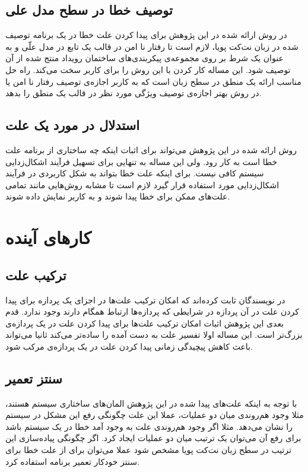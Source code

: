 \subsection{توصیف خطا در سطح مدل علی}
در روش ارائه شده در این پژوهش برای پیدا کردن علت خطا در یک برنامه توصیف شده در زبان نت‌کت پویا، لازم است تا رفتار نا امن در قالب یک تابع در مدل علّی و به عنوان یک شرط بر روی مجموعه‌ی پیکربندی‌های ساختمان رویداد منتج شده از‌ آن توصیف شود.
این مساله کار کردن با این روش را برای کاربر سخت می‌کند. 
راه حل مناسب ارائه یک منطق در سطح زبان است که به کاربر اجازه‌ی توصیف رفتار نا امن یا در روش بهتر اجازه‌ی توصیف ویژگی مورد نظر در قالب یک منطق را بدهد.

\subsection{استدلال در مورد یک علت}
روش ارائه شده در این پژوهش می‌تواند برای اثبات اینکه چه ساختاری از برنامه علت خطا است به کار رود. 
ولی این مساله به تنهایی برای تسهیل فرآیند اشکال‌زدایی سیستم کافی نیست.
برای اینکه علت خطا بتواند به شکل کاربردی در فرآیند اشکال‌زدایی مورد استفاده قرار گیرد لازم است تا مشابه روش‌هایی مانند
\cite{chockler}
تمامی علت‌های ممکن برای خطا پیدا شوند و به کاربر نمایش داده شوند.

\section{کار‌های آینده}

\subsection{ترکیب علت}
در 
\cite{causal-hml}
نویسندگان ثابت کرده‌اند که امکان ترکیب علت‌ها در اجزای یک پردازه برای پیدا کردن علت در آن پردازه در شرایطی که پردازه‌ها ارتباط  
همگام دارند وجود ندارد.
قدم بعدی این پژوهش اثبات امکان ترکیب علت‌ها برای پیدا کردن علت در یک پردازه‌ی بزرگ‌تر است.
این مساله اولا تفسیر علت به دست آمده را ساده‌تر می‌کند ثانیا می‌تواند باعث کاهش پیچیدگی زمانی پیدا کردن علت در یک پردازه‌ی مرکب شود.

\subsection{سنتز تعمیر}
با توجه به اینکه علت‌های پیدا شده در این پژوهش المان‌های ساختاری سیستم هستند، مثلا وجود هم‌روندی میان دو عملیات، عملا این علت چگونگی رفع این مشکل در سیستم‌ را نشان می‌دهد. مثلا اگر وجود هم‌روندی علت به وجود آمد خطا در یک سیستم باشد برای رفع آن می‌توان یک ترتیب میان دو عملیات ایجاد کرد.
اگر چگونگی پیاده‌سازی این ترتیب در سطح زبان نت‌کت پویا مشخص شود عملا می‌توان برای از علت خطا برای سنتز خودکار تعمیر برنامه استفاده کرد.

